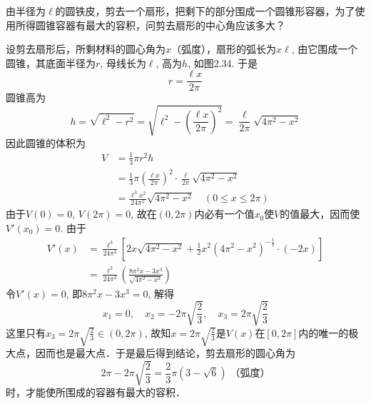 \begin{example}
由半径为$\ell$的圆铁皮，剪去一个扇形，把剩下的部分围成一个圆锥形容器，为了使用所得圆锥容器有最大的容积，问剪去扇形的中心角应该多大？
\end{example}

\begin{figure}[htp]
    \centering
{}
    \caption{}
\end{figure}


\begin{solution}
    设剪去扇形后，所剩材料的圆心角为$x$（弧度），扇形的弧长为$x\ell$, 由它围成一个圆锥，其底面半径为$r$, 母线长为$\ell$, 高为$h$, 如图2.34. 于是
\[r=\frac{\ell x}{2\pi}\]
圆锥高为
\[h=\sqrt{\ell^2-r^2}=\sqrt{\ell^2-\left(\frac{\ell x}{2\pi}\right)^2}=\frac{\ell }{2\pi}\sqrt{4\pi^2-x^2}\]
因此圆锥的体积为
\begin{align*}
    V&=\frac{1}{3}\pi r^2 h\\
    &=\frac{1}{3}\pi\left(\frac{\ell x}{2\pi}\right)^2\cdot \frac{\ell}{2\pi}\sqrt{4\pi^2-x^2}\\
    &=\frac{\ell^3 x^2}{24\pi^2}\sqrt{4\pi^2-x^2}\quad (0\le x\le 2\pi)
\end{align*}
由于$V(0)=0$, $V(2\pi)=0$, 故在$(0, 2\pi)$内必有一个值$x_0$使$V$的值最大，因而使$V'(x_0)=0$. 由于
\begin{align*}
    V'(x)&=\frac{\ell^3}{24\pi^2}\left[2x\sqrt{4\pi^2-x^2}+\frac{1}{2}x^2(4\pi^2-x^2)^{-\tfrac{1}{2}}\cdot (-2x)\right]\\
    &=\frac{\ell^3}{24\pi^2}\left(\frac{8\pi^2 x-3x^3}{\sqrt{4\pi^2-x^2}}\right)
\end{align*}
令$V'(x)=0$, 即$8\pi^2 x-3x^3=0$, 解得
\[x_1=0,\quad x_2=-2\pi\sqrt{\frac{2}{3}}, \quad x_3=2\pi\sqrt{\frac{2}{3}}\]
这里只有$x_3=2\pi\sqrt{\frac{2}{3}}\in (0, 2\pi)$, 故知$x=2\pi\sqrt{\frac{2}{3}}$是$V(x)$在$[0, 2\pi]$内的唯一的极大点，因而也是最大点．于是最后得到结论，剪去扇形的圆心角为
\[2\pi-2\pi\sqrt{\frac{2}{3}}=\frac{2}{3}\pi\left(3-\sqrt{6}\right)\; \text{（弧度）}\]
时，才能使所围成的容器有最大的容积．
\end{solution}

